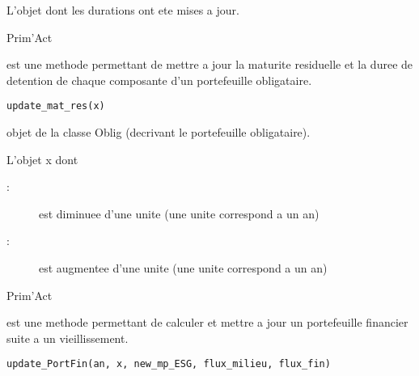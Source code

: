 \documentclass[a4paper]{book}
\begin{document}
%
\begin{Value}
L'objet  dont les durations ont ete mises a jour.
\end{Value}
%
\begin{Author}\relax
Prim'Act
\end{Author}
%
\begin{Description}\relax
{} est une methode permettant de mettre a jour la maturite residuelle et la duree de detention
de chaque composante d'un portefeuille obligataire.
\end{Description}
%
\begin{Usage}
\begin{verbatim}
update_mat_res(x)
\end{verbatim}
\end{Usage}
%
\begin{Arguments}
\begin{ldescription}
\item[\code{x}] objet de la classe Oblig (decrivant le portefeuille obligataire).
\end{ldescription}
\end{Arguments}
%
\begin{Value}
L'objet x dont
\begin{description}

\item[ : ] est diminuee d'une unite (une unite correspond a un an)
\item[ : ] est augmentee d'une unite (une unite correspond a un an)

\end{description}

\end{Value}
%
\begin{Author}\relax
Prim'Act
\end{Author}
%
\begin{Description}\relax
{} est une methode permettant de calculer et mettre a jour un portefeuille financier
suite a un vieillissement.
\end{Description}
%
\begin{Usage}
\begin{verbatim}
update_PortFin(an, x, new_mp_ESG, flux_milieu, flux_fin)
\end{verbatim}
\end{Usage}
\end{document}
